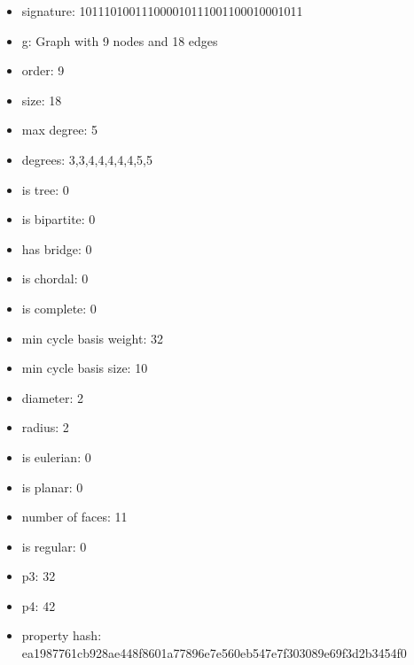 \newpage
\begin{figure}
\end{figure}
\begin{itemize}
\item signature: 101110100111000010111001100010001011
\item g: Graph with 9 nodes and 18 edges
\item order: 9
\item size: 18
\item max degree: 5
\item degrees: 3,3,4,4,4,4,4,5,5
\item is tree: 0
\item is bipartite: 0
\item has bridge: 0
\item is chordal: 0
\item is complete: 0
\item min cycle basis weight: 32
\item min cycle basis size: 10
\item diameter: 2
\item radius: 2
\item is eulerian: 0
\item is planar: 0
\item number of faces: 11
\item is regular: 0
\item p3: 32
\item p4: 42
\item property hash: ea1987761cb928ae448f8601a77896e7e560eb547e7f303089e69f3d2b3454f0
\end{itemize}
